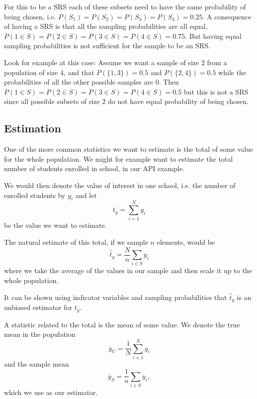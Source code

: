 \documentclass{article}
\begin{document}
For this to be a SRS each of these subsets need to have the same probability of
being chosen, i.e. $P(S_1) = P(S_2) = P(S_3) = P(S_4) = 0.25$. A consequence of
having a SRS is that all the sampling probabilities are all equal, $P(1 \in S) =
P(2 \in S) = P(3 \in S) = P(4 \in S) = 0.75$. But having equal sampling
probabilities is not sufficient for the sample to be an SRS.

Look for example at this case:
Assume we want a sample of size $2$ from a population of size $4$, and that
$P(\{1, 3\}) = 0.5$ and $P(\{2, 4\}) = 0.5$ while the probabilities of all the
other possible samples are $0$. Then $P(1 \in S) = P(2 \in S) = P(3 \in S) = P(4 \in S) = 0.5$
but this is not a SRS since all possible subsets of size $2$ do not have equal
probability of being chosen.


\subsection{Estimation}

One of the more common statistics we want to estimate is the total of some value
for the whole population. We might for example want to estimate the total number
of students enrolled in school, in our API example.

We would then denote the value of interest in one school, i.e. the number of
enrolled students by $y_i$ and let
\begin{equation*}
  t_y = \sum_{i = 1}^{N} y_i
\end{equation*}
be the value we want to estimate.

The natural estimate of this total, if we sample $n$ elements, would be
\begin{equation*}
\hat{t}_y = \frac{N}{n}\sum_{i \in S} y_i
\end{equation*}
where we take the average of the values in our sample and then scale it up to
the whole population.

It can be shown using indicator variables and sampling probabilities that
$\hat{t}_y$ is an unbiased estimator for $t_y$.


A statistic related to the total is the mean of some value. We denote the true
mean in the population
\begin{equation*}
\bar{y}_U = \frac{1}{N} \sum_{i = 1}^{N} y_i
\end{equation*}
and the sample mean
\begin{equation*}
\bar{y}_S = \frac{1}{n} \sum_{i \in S} y_i ,
\end{equation*}
which we use as our estimator.
\end{document}
